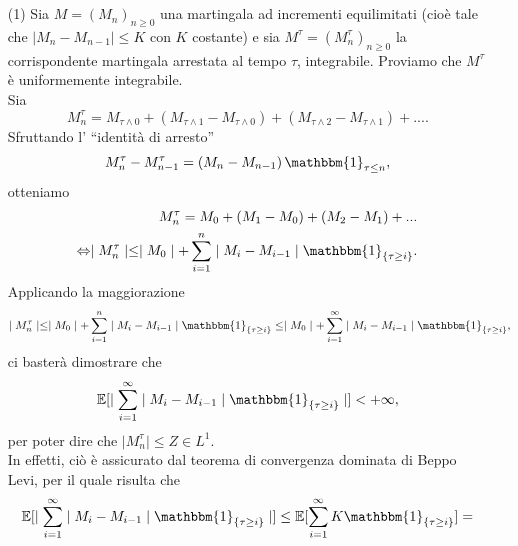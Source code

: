 \documentclass[12pt]{homework}
\begin{document}
  \section{}%
  \begin{enumerate}
  \item[(1)]
  Sia $M=\left(M_{n}\right)_{n\geq 0}$ una martingala ad incrementi equilimitati (cioè tale che $\mid M_{n}-M_{n-1}\mid\leq K$ con $K$ costante) e sia $M^{\tau}=\left(M_{n}^{\tau}\right)_{n\geq 0}$ la corrispondente martingala arrestata al tempo $\tau $, integrabile. Proviamo che $M^{\tau}$ è uniformemente integrabile.\\
  Sia
  \begin{equation*}
  M_{n}^{\tau}=M_{\tau\wedge 0}+\left(M_{\tau\wedge 1}-M_{\tau\wedge 0}\right)+\left(M_{\tau\wedge 2}-M_{\tau\wedge 1}\right)+....
  \end{equation*}
  Sfruttando l' ``identità di arresto''
  \begin{equation*}
  M_{n}^{\tau}-M_{n-1}^{\tau}=\left(M_{n}-M_{n-1}\right)\mathbbm{1}_{\tau\leq n},
  \end{equation*}
  otteniamo
  \begin{align*}
   M_{n}^{\tau}=M_{0}+\left(M_{1}-M_{0}\right)+\left(M_{2}-M_{1}\right)+...\\
   \Leftrightarrow\mid M_{n}^{\tau}\mid \leq \mid M_{0}\mid + \sum_{i=1}^{n}\mid M_{i}-M_{i-1}\mid \mathbbm{1}_{\{\tau\geq i\}}.
  \end{align*}
  Applicando la maggiorazione
  \begin{equation*}
\mid M_{n}^{\tau}\mid \leq \mid M_{0}\mid + \sum_{i=1}^{n}\mid M_{i}-M_{i-1}\mid \mathbbm{1}_{\{\tau\geq i\}}\leq \mid M_{0}\mid + \sum_{i=1}^{\infty}\mid M_{i}-M_{i-1}\mid \mathbbm{1}_{\{\tau\geq i\}},
     \end{equation*}
     ci basterà dimostrare che
     \begin{equation*}
     \mathbb{E}[\mid \sum_{i=1}^{\infty}\mid M_{i}-M_{i-1}\mid \mathbbm{1}_{\{\tau\geq i\}} \mid]<+\infty,
     \end{equation*}
     per poter dire che  $\mid M_{n}^{\tau}\mid\leq Z \in L^{1}$.\\
     In effetti, ciò è assicurato dal teorema di convergenza dominata di Beppo Levi, per il quale risulta che
     \begin{align*}
      &\mathbb{E}[\mid \sum_{i=1}^{\infty}\mid M_{i}-M_{i-1}\mid \mathbbm{1}_{\{\tau\geq i\}} \mid]\leq  \mathbb{E}[\sum_{i=1}^{\infty}K \mathbbm{1}_{\{\tau\geq i\}} ]=\\

\end{align*}
\end{enumerate}
\end{document}
